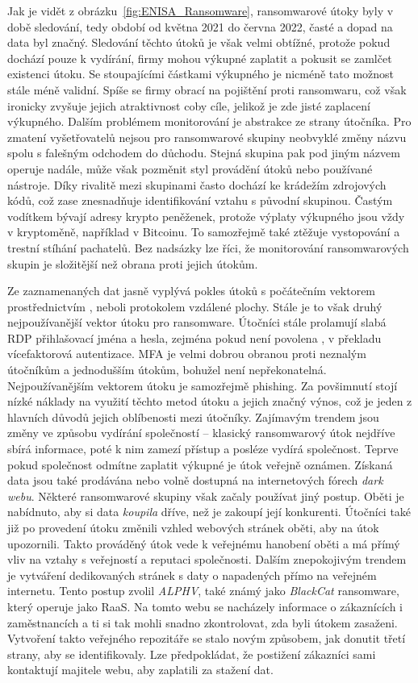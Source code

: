 Jak je vidět z obrázku~\ref{fig:ENISA_Ransomware}, ransomwarové útoky byly v době sledování, tedy období od května 2021 do června 2022, časté a dopad na data byl značný.
Sledování těchto útoků je však velmi obtížné, protože pokud dochází pouze k vydírání, firmy mohou výkupné zaplatit a pokusit se zamlčet existenci útoku.
Se stoupajícími částkami výkupného je nicméně tato možnost stále méně validní.
Spíše se firmy obrací na pojištění proti ransomwaru, což však ironicky zvyšuje jejich atraktivnost coby cíle, jelikož je zde jisté zaplacení výkupného.
Dalším problémem monitorování je abstrakce ze strany útočníka.
Pro zmatení vyšetřovatelů nejsou pro ransomwarové skupiny neobvyklé změny názvu spolu s falešným odchodem do důchodu.
Stejná skupina pak pod jiným názvem operuje nadále, může však pozměnit styl provádění útoků nebo používané nástroje.
Díky rivalitě mezi skupinami často dochází ke krádežím zdrojových kódů, což zase znesnadňuje identifikování vztahu s původní skupinou.
Častým vodítkem bývají adresy krypto peněženek, protože výplaty výkupného jsou vždy v kryptoměně, například v Bitcoinu.
To samozřejmě také ztěžuje vystopování a trestní stíhání pachatelů.
Bez nadsázky lze říci, že monitorování ransomwarových skupin je složitější než obrana proti jejich útokům.\cite{Enisa_thread_landscape}

Ze zaznamenaných dat jasně vyplývá pokles útoků s počátečním vektorem prostřednictvím , neboli protokolem vzdálené plochy.
Stále je to však druhý nejpoužívanější vektor útoku pro ransomware.
Útočníci stále prolamují slabá \ac{RDP} přihlašovací jména a hesla, zejména pokud není povolena , v překladu vícefaktorová autentizace.
\ac{MFA} je velmi dobrou obranou proti neznalým útočníkům a jednodušším útokům, bohužel není nepřekonatelná.
Nejpoužívanějším vektorem útoku je samozřejmě phishing.
Za povšimnutí stojí nízké náklady na využití těchto metod útoku a jejich značný výnos, což je jeden z hlavních důvodů jejich oblíbenosti mezi útočníky.
Zajímavým trendem jsou změny ve způsobu vydírání společností -- klasický ransomwarový útok nejdříve sbírá informace, poté k nim zamezí přístup a posléze vydírá společnost.
Teprve pokud společnost odmítne zaplatit výkupné je útok veřejně oznámen.
Získaná data jsou také prodávána nebo volně dostupná na internetových fórech \textit{dark webu}.
Některé ransomwarové skupiny však začaly používat jiný postup.
Oběti je nabídnuto, aby si data \textit{koupila} dříve, než je zakoupí její konkurenti.
Útočníci také již po provedení útoku změnili vzhled webových stránek oběti, aby na útok upozornili.
Takto prováděný útok vede k veřejnému hanobení oběti a má přímý vliv na vztahy s veřejností a reputaci společnosti.
Dalším znepokojivým trendem je vytváření dedikovaných stránek s daty o napadených přímo na veřejném internetu.
Tento postup zvolil \textit{ALPHV}, také známý jako \textit{BlackCat} ransomware, který operuje jako \ac{RaaS}\cite{ALPHV_blackcat}.
Na tomto webu se nacházely informace o zákaznících i zaměstnancích a ti si tak mohli snadno zkontrolovat, zda byli útokem zasaženi.
Vytvoření takto veřejného repozitáře se stalo novým způsobem, jak donutit třetí strany, aby se identifikovaly.
Lze předpokládat, že postižení zákazníci sami kontaktují majitele webu, aby zaplatili za stažení dat.

